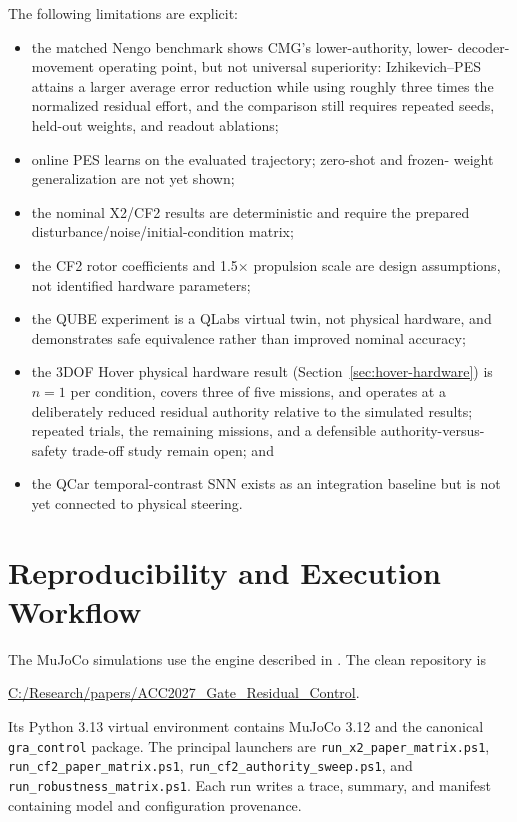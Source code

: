 \documentclass[10pt,twocolumn]{article}
\begin{document}
The following limitations are explicit:
\begin{itemize}
    \item the matched Nengo benchmark shows CMG's lower-authority, lower-
    decoder-movement operating point, but not universal superiority:
    Izhikevich--PES attains a larger average error reduction while using
    roughly three times the normalized residual effort, and the comparison
    still requires repeated seeds, held-out weights, and readout ablations;
    \item online PES learns on the evaluated trajectory; zero-shot and frozen-
    weight generalization are not yet shown;
    \item the nominal X2/CF2 results are deterministic and require the prepared
    disturbance/noise/initial-condition matrix;
    \item the CF2 rotor coefficients and 1.5$\times$ propulsion scale are design
    assumptions, not identified hardware parameters;
    \item the QUBE experiment is a QLabs virtual twin, not physical hardware,
    and demonstrates safe equivalence rather than improved nominal accuracy;
    \item the 3DOF Hover physical hardware result
    (Section~\ref{sec:hover-hardware}) is $n=1$ per condition, covers three
    of five missions, and operates at a deliberately reduced residual
    authority relative to the simulated results; repeated trials, the
    remaining missions, and a defensible authority-versus-safety trade-off
    study remain open; and
    \item the QCar temporal-contrast SNN exists as an integration baseline but
    is not yet connected to physical steering.
\end{itemize}

\section{Reproducibility and Execution Workflow}

The MuJoCo simulations use the engine described in \cite{todorov2012mujoco}.
The clean repository is
\begin{center}
\url{C:/Research/papers/ACC2027_Gate_Residual_Control}.
\end{center}
Its Python 3.13 virtual environment contains MuJoCo 3.12 and the canonical
\texttt{gra\_control} package. The principal launchers are
\texttt{run\_x2\_paper\_matrix.ps1},
\texttt{run\_cf2\_paper\_matrix.ps1},
\texttt{run\_cf2\_authority\_sweep.ps1}, and
\texttt{run\_robustness\_matrix.ps1}. Each run writes a trace, summary, and
manifest containing model and configuration provenance.
\end{document}
